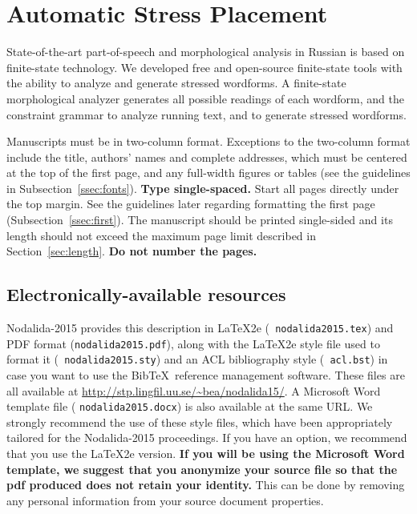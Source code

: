 \documentclass[11pt]{article}
\begin{document}
\section{Automatic Stress Placement}

State-of-the-art part-of-speech and morphological analysis in Russian is based on finite-state
technology. We developed free and open-source finite-state tools with the ability to analyze and
generate stressed wordforms. A finite-state morphological analyzer generates all possible readings
of each wordform, and the constraint grammar 
to analyze running text, and to generate stressed wordforms. 

Manuscripts must be in two-column format.  Exceptions to the
two-column format include the title, authors' names and complete
addresses, which must be centered at the top of the first page, and
any full-width figures or tables (see the guidelines in
Subsection~\ref{ssec:fonts}). {\bf Type single-spaced.}  Start all
pages directly under the top margin. See the guidelines later
regarding formatting the first page (Subsection~\ref{ssec:first}).
The manuscript should be printed single-sided and its length should
not exceed the maximum page limit described in
Section~\ref{sec:length}.  {\bf Do not number the pages.}

\subsection{Electronically-available resources}

Nodalida-2015 provides this description in \LaTeX2e ({\small {\tt
    nodalida2015.tex}}) and PDF format ({\small {\tt nodalida2015.pdf}}),
along with the \LaTeX2e style file used to format it ({\small {\tt
    nodalida2015.sty}}) and an ACL bibliography style ({\small {\tt
    acl.bst}}) in case you want to use the Bib\TeX\ reference management
software. These files are all available at
\url{http://stp.lingfil.uu.se/~bea/nodalida15/}. A Microsoft Word template file ({\small
  {\tt nodalida2015.docx}}) is also available at the same URL. We strongly
recommend the use of these style files, which have been appropriately
tailored for the Nodalida-2015 proceedings. If you have an option, we
recommend that you use the \LaTeX2e version. \textbf{If you will be
  using the Microsoft Word template, we suggest that you anonymize
  your source file so that the pdf produced does not retain your
  identity.}  This can be done by removing any personal information
from your source document properties.
\end{document}
